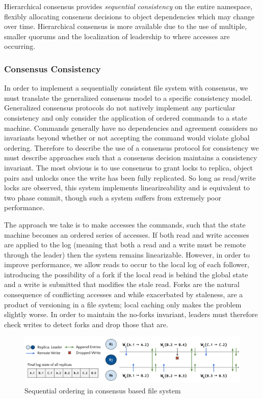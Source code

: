\documentclass{article}
\begin{document}
Hierarchical consensus provides \textit{sequential consistency} on the entire namespace, flexibly allocating consensus decisions to object dependencies which may change over time. Hierarchical consensus is more available due to the use of multiple, smaller quorums and the localization of leadership to where accesses are occurring.

\subsubsection{Consensus Consistency}

In order to implement a sequentially consistent file system with consensus, we must translate the generalized consensus model to a specific consistency model. Generalized consensus protocols do not natively implement any particular consistency and only consider the application of ordered commands to a state machine. Commands generally have no dependencies and agreement considers no invariants beyond whether or not accepting the command would violate global ordering. Therefore to describe the use of a consensus protocol for consistency we must describe approaches such that a consensus decision maintains a consistency invariant. The most obvious is to use consensus to grant locks to replica, object pairs and unlocks once the write has been fully replicated. So long as read/write locks are observed, this system implements linearizeability and is equivalent to two phase commit, though such a system suffers from extremely poor performance.

The approach we take is to make accesses the commands, such that the state machine becomes an ordered series of accesses. If both read and write accesses are applied to the log (meaning that both a read and a write must be remote through the leader) then the system remains linearizable. However, in order to improve performance, we allow reads to occur to the local log of each follower, introducing the possibility of a fork if the local read is behind the global state and a write is submitted that modifies the stale read. Forks are the natural consequence of conflicting accesses and while exacerbated by staleness, are a product of versioning in a file system; local caching only makes the problem slightly worse. In order to maintain the no-forks invariant, leaders must therefore check writes to detect forks and drop those that are.

\begin{figure}
    \centering
        \includegraphics[width=.9\textwidth]{figures/ordered}
        \caption{Sequential ordering in consensus based file system}
        \label{fig:ordered}
\end{figure}
\end{document}
